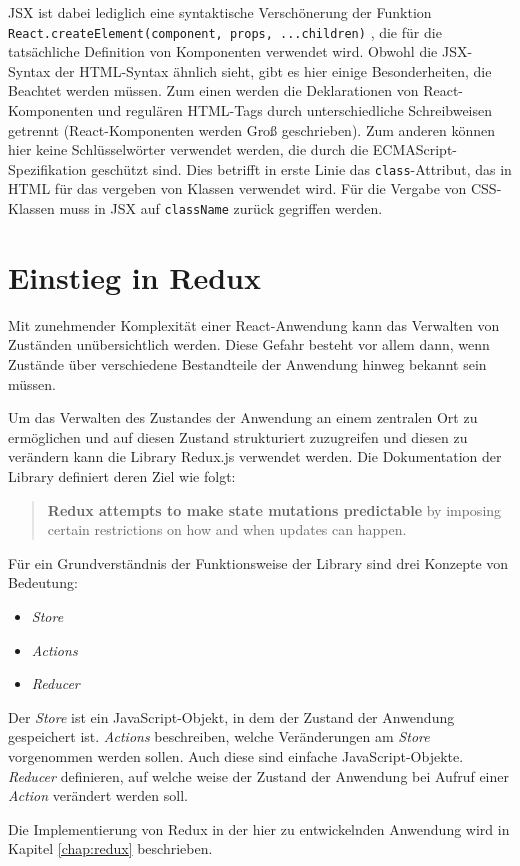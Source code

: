 JSX ist dabei lediglich eine syntaktische Verschönerung der Funktion \verb|React.createElement(component, props, ...children)| \cite{ReactJSX}, die für die tatsächliche Definition von Komponenten verwendet wird.
Obwohl die JSX-Syntax der HTML-Syntax ähnlich sieht, gibt es hier einige Besonderheiten, die Beachtet werden müssen.
Zum einen werden die Deklarationen von React-Komponenten und regulären HTML-Tags durch unterschiedliche Schreibweisen getrennt (React-Komponenten werden Groß geschrieben).
Zum anderen können hier keine Schlüsselwörter verwendet werden, die durch die ECMAScript-Spezifikation geschützt sind\footnotemark{}. Dies betrifft in erste Linie das \verb|class|-Attribut, das in HTML für das vergeben von Klassen verwendet wird. Für die Vergabe von CSS-Klassen muss in JSX auf \verb|className| zurück gegriffen werden.


\section{Einstieg in Redux}
Mit zunehmender Komplexität einer React-Anwendung kann das Verwalten von Zuständen unübersichtlich werden. Diese Gefahr besteht vor allem dann, wenn Zustände über verschiedene Bestandteile der Anwendung hinweg bekannt sein müssen.

Um das Verwalten des Zustandes der Anwendung an einem zentralen Ort zu ermöglichen und auf diesen Zustand strukturiert zuzugreifen und diesen zu verändern kann die Library Redux.js\footnotemark{} verwendet werden. Die Dokumentation der Library definiert deren Ziel wie folgt:


\begin{quote}
  \textbf{Redux attempts to make state mutations predictable} by imposing certain restrictions on how and when updates can happen. \cite{ReduxMotivation}
\end{quote}

Für ein Grundverständnis der Funktionsweise der Library sind drei Konzepte von Bedeutung:

\begin{itemize}
  \item \textit{Store}
  \item \textit{Actions}
  \item \textit{Reducer}
\end{itemize}

Der \textit{Store} ist ein JavaScript-Objekt, in dem der Zustand der Anwendung gespeichert ist. \textit{Actions} beschreiben, welche Veränderungen am \textit{Store} vorgenommen werden sollen. Auch diese sind einfache JavaScript-Objekte. \textit{Reducer} definieren, auf welche weise der Zustand der Anwendung bei Aufruf einer \textit{Action} verändert werden soll. \cite{ReduxCore}

Die Implementierung von Redux in der hier zu entwickelnden Anwendung wird in Kapitel \ref{chap:redux} beschrieben.
